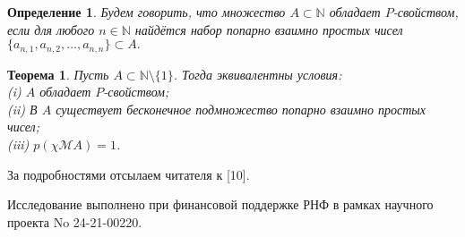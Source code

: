 \documentclass[14pt, a4paper]{extbook}
\newtheorem{theorem}{Теорема}
\newtheorem{definition}{Определение}
\begin{document}
	\begin{definition}
		Будем говорить, что множество $A\subset\mathbb{N}$ обладает $P$-свойством,
		если для любого $n\in\mathbb{N}$ найдётся набор попарно взаимно простых чисел
		$
			\{a_{n,1}, a_{n,2}, ..., a_{n,n}  \} \subset A
			.
		$
	\end{definition}

	\begin{theorem}
		Пусть $A\subset \mathbb{N}\setminus\{1\}$.
		Тогда эквивалентны условия:
		\\(i)
			$A$ обладает $P$-свойством;
		\\(ii)
			В $A$ существует бесконечное подмножество попарно взаимно простых чисел;
		\\(iii)
			$p(\chi\mathcal{M}A)=1$.
	\end{theorem}

За подробностями отсылаем читателя к [10].%



{\small Исследование выполнено при финансовой поддержке РНФ в рамках научного проекта No 24-21-00220.} %

\end{document}

